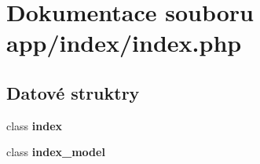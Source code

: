 \section{Dokumentace souboru app/index/index.php}
\label{de/deb/app_2index_2index_8php}
\subsection*{Datové struktry}
\begin{DoxyCompactItemize}
\item 
class {\bf index}
\item 
class {\bf index\_\-model}
\end{DoxyCompactItemize}
